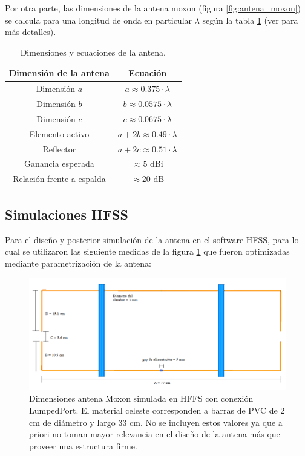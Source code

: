 Por otra parte, las dimensiones de la antena moxon (figura \ref{fig:antena_moxon}) se calcula para una longitud de onda en particular $\lambda$ según la tabla \ref{tab:antena_dimensiones} (ver \cite{moxonAntenna} para más detalles). 

\begin{table}[h!]
    \centering
    \begin{tabular}{|c|c|}
        \hline
        \textbf{Dimensión de la antena} & \textbf{Ecuación} \\
        \hline
        Dimensión $a$ & $a \approx 0.375 \cdot \lambda$ \\
        \hline
        Dimensión $b$ & $b \approx 0.0575 \cdot \lambda$ \\
        \hline
        Dimensión $c$ & $c \approx 0.0675 \cdot \lambda$ \\
        \hline
        Elemento activo & $a + 2b \approx 0.49 \cdot \lambda$ \\
        \hline
        Reflector & $a + 2c \approx 0.51 \cdot \lambda$ \\
        \hline
        Ganancia esperada & $\approx 5 \text{ dBi}$ \\
        \hline
        Relación frente-a-espalda & $\approx 20 \text{ dB}$ \\
        \hline
    \end{tabular}
    \caption{Dimensiones y ecuaciones de la antena.}
    \label{tab:antena_dimensiones}
\end{table}


\subsection{Simulaciones HFSS}
Para el diseño y posterior simulación de la antena en el software HFSS, para lo cual se utilizaron las siguiente medidas de la figura \ref{fig:dimensiones_moxon} que fueron optimizadas mediante parametrización de la antena:

\begin{figure}[h]
    \centering
    \includegraphics[width=0.85\linewidth]{img/dimensiones_moxon.png}
    \caption{Dimensiones antena Moxon simulada en HFFS con conexión LumpedPort. El material celeste corresponden a barras de PVC de 2 cm de diámetro y largo 33 cm. No se incluyen estos valores ya que a priori no toman mayor relevancia en el diseño de la antena más que proveer una estructura firme.}
    \label{fig:dimensiones_moxon}
\end{figure}

